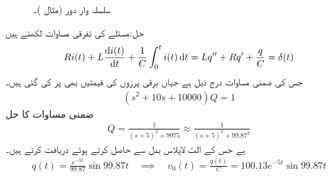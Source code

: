 \begin{figure}
\centering
\begin{subfigure}{0.45\textwidth}
\centering
{}
\end{subfigure} \hfill
\begin{subfigure}{0.45\textwidth}
\centering
{}
\end{subfigure} 
\caption{سلسلہ وار دور (مثال )۔}
\label{شکل_مثال_سلسلہ_وار_دور_اکائی_ضرب}
\end{figure}

حل:مسئلے کی تفرقی مساوات لکھتے ہیں
\begin{align*}
Ri(t)+L\frac{\dif i(t)}{\dif t}+\frac{1}{C}\int_{0}^{t} i(t)\dif t=Lq''+Rq'+\frac{q}{C}=\delta(t)
\end{align*}
جس کی ضمنی مساوات درج ذیل ہے جہاں برقی پرزوں کی قیمتیں بھی پر کی گئی ہیں۔
\begin{align*}
(s^2+10s+10000)Q=1
\end{align*}
ضمنی مساوات کا حل
\begin{align*}
Q=\frac{1}{(s+5)^2+9975}\approx \frac{1}{(s+5)^2+99.87^2}
\end{align*}
ہے جس کے الٹ لاپلاس بدل سے  حاصل کرتے ہوئے  دریافت کرتے ہیں۔
\begin{align*}
q(t)=\frac{e^{-5t}}{99.87}\sin 99.87 t\quad \implies \quad v_0(t)=\frac{q(t)}{C}=100.13e^{-5t}\sin 99.87t
\end{align*}

